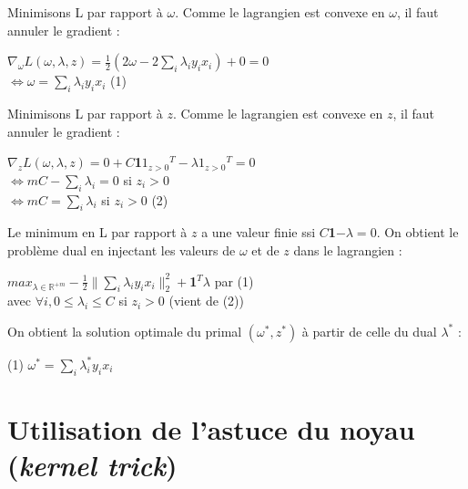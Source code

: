 \documentclass{beamer}
\begin{document}
\begin{frame}
Minimisons L par rapport à $\omega$. Comme le lagrangien est convexe en $\omega$, il faut annuler le gradient :\\

              \begin{center}
              $\nabla_{\omega} L(\omega, \lambda, z) = \frac{1}{2}(2\omega - 2\sum_i \lambda_iy_ix_i) + 0 = 0$\\
              $\Leftrightarrow \omega = \sum_i \lambda_iy_ix_i$ (1)\\
              \end{center}

Minimisons L par rapport à $z$. Comme le lagrangien est convexe en $z$, il faut annuler le gradient :\\

              \begin{center}
              $\nabla_{z} L(\omega, \lambda, z) = 0 + C$\textbf{1}\textbf{$1_{z>0}$}$^T - \lambda$\textbf{$1_{z>0}$}$^T = 0$\\
              $\Leftrightarrow mC - \sum_i \lambda_i = 0$ si $z_i > 0$\\
              $\Leftrightarrow mC = \sum_i \lambda_i$ si $z_i > 0$ (2)\\
              \end{center}

Le minimum en L par rapport à $z$ a une valeur finie ssi $C$\textbf{1}$ - \lambda = 0$. On obtient le problème dual en injectant les valeurs de $\omega$ et de $z$ dans le lagrangien :\\

             \begin{center}
             $max_{\lambda \in \mathbb{R}^{+m}} -\frac{1}{2}\|\sum_i\lambda_iy_ix_i\|^2_2 + $\textbf{1}$^T\lambda$ par (1)\\ 
             avec $\forall i, 0 \leq \lambda_i \leq C$ si $z_i > 0$ (vient de (2))\\
             \end{center}

On obtient la solution optimale du primal $(\omega^*, z^*)$ à partir de celle du dual $\lambda^*$ :

             \begin{center}
             (1) $\omega^{*} = \sum_i \lambda^{*}_i y_i x_i$
             \end{center}

\section{Utilisation de l'astuce du noyau (\emph{kernel trick})}


\end{frame}
\end{document}
